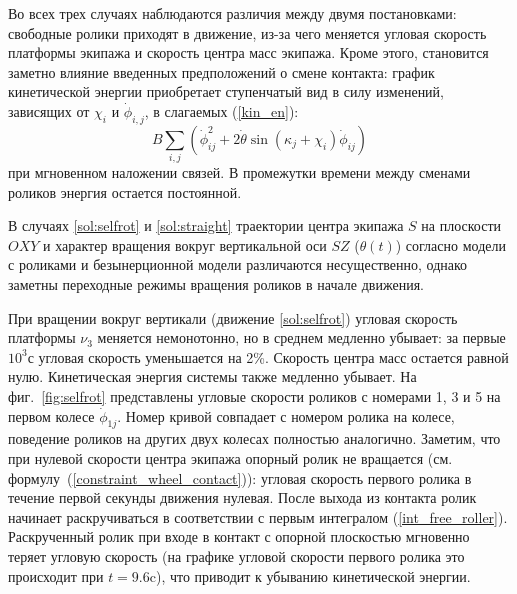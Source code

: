 Во всех трех случаях наблюдаются различия между двумя постановками: свободные ролики приходят в движение, из-за чего меняется угловая скорость платформы экипажа и скорость центра масс экипажа. Кроме этого, становится заметно влияние введенных предположений о смене контакта: график кинетической энергии приобретает ступенчатый вид в силу изменений, зависящих от $\chi_i$ и $\dot{\phi}_{i,j}$, в слагаемых (\ref{kin_en}): 
\begin{equation}\label{sines_in_kin_en}
    B\sum_{i,j}(\dot{\phi}_{ij}^2 + 2\dot{\theta}\sin(\kappa_j + \chi_i)\dot{\phi}_{ij})
\end{equation}
при мгновенном наложении связей. В промежутки времени между сменами роликов энергия остается постоянной. 

В случаях \ref{sol:selfrot} и \ref{sol:straight} траектории центра экипажа $S$ на плоскости $OXY$ и характер вращения вокруг вертикальной оси $SZ$ ($\theta(t)$) согласно модели с роликами и безынерционной модели различаются несущественно, однако заметны переходные режимы вращения роликов в начале движения.

При вращении вокруг вертикали (движение \ref{sol:selfrot}) угловая скорость платформы $\nu_3$ меняется немонотонно, но в среднем медленно убывает: за первые $10^3$с угловая скорость уменьшается на 2\%. Скорость центра масс остается равной нулю. Кинетическая энергия системы также медленно убывает. На 
фиг.~\ref{fig:selfrot} представлены угловые скорости роликов с номерами 1, 3 и 5 на первом колесе $\dot{\phi}_{1j}$. Номер кривой совпадает с номером ролика на колесе, поведение роликов на других двух колесах полностью аналогично. Заметим, что при нулевой скорости центра экипажа опорный ролик не вращается (см. формулу~(\ref{constraint_wheel_contact})): угловая скорость первого ролика в течение первой секунды движения нулевая. После выхода из контакта ролик начинает раскручиваться в соответствии с первым интегралом (\ref{int_free_roller}). Раскрученный ролик при входе в контакт с опорной плоскостью мгновенно теряет угловую скорость (на графике угловой скорости первого ролика это происходит при $t=9.6$c), что приводит к убыванию кинетической энергии.

